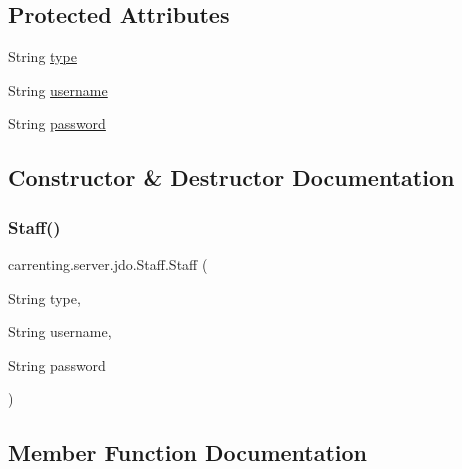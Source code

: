 \subsection*{Protected Attributes}
\begin{DoxyCompactItemize}
\item 
String \mbox{\hyperlink{classcarrenting_1_1server_1_1jdo_1_1_staff_a10c0416d6043122204e301b5626c78d5}{type}}
\item 
String \mbox{\hyperlink{classcarrenting_1_1server_1_1jdo_1_1_staff_a38063bb7f3d9cfa4b9c3eff15638ecbc}{username}}
\item 
String \mbox{\hyperlink{classcarrenting_1_1server_1_1jdo_1_1_staff_adbd5952cba08906f79b3e40e58bfbf6e}{password}}
\end{DoxyCompactItemize}


\subsection{Constructor \& Destructor Documentation}
\mbox{\label{classcarrenting_1_1server_1_1jdo_1_1_staff_ae44967323617b6fe2c0404270a5470d4}} 
\subsubsection{\texorpdfstring{Staff()}{Staff()}}
{\footnotesize\ttfamily carrenting.\+server.\+jdo.\+Staff.\+Staff (\begin{DoxyParamCaption}\item[{String}]{type,  }\item[{String}]{username,  }\item[{String}]{password }\end{DoxyParamCaption})}



\subsection{Member Function Documentation}
\mbox{\label{classcarrenting_1_1server_1_1jdo_1_1_staff_aeb06f4e58a110ec1d95628d45639c11b}} 
